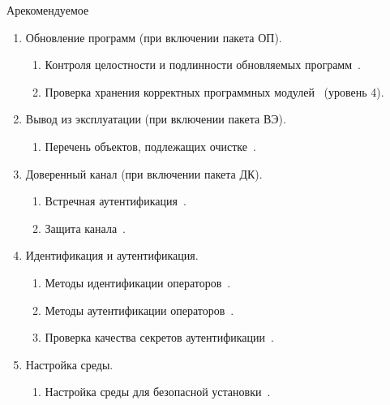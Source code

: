 \begin{appendix}{А}{рекомендуемое}
\begin{enumerate}
\begin{enumerate}
\item
Статистическое тестирование~.
\end{enumerate}

\item
Обновление программ (при включении пакета ОП).

\begin{enumerate}
\item
Контроля целостности и подлинности обновляемых программ~.

\item
Проверка хранения корректных программных модулей~ (уровень 4).
\end{enumerate}

\item
Вывод из эксплуатации (при включении пакета ВЭ).

\begin{enumerate}
\item
Перечень объектов, подлежащих очистке~.
\end{enumerate}

\item
Доверенный канал (при включении пакета ДК).

\begin{enumerate}
\item
Встречная аутентификация~.
\item
Защита канала~.
\end{enumerate}

\item
{Идентификация и аутентификация.}

\begin{enumerate}
\item
Методы идентификации операторов~.

\item
Методы аутентификации операторов~.

\item
Проверка качества секретов аутентификации~.
\end{enumerate}

\item
{Настройка среды.}

\begin{enumerate}
\item
Настройка среды для безопасной установки~.


\end{enumerate}
\end{enumerate}
\end{appendix}
